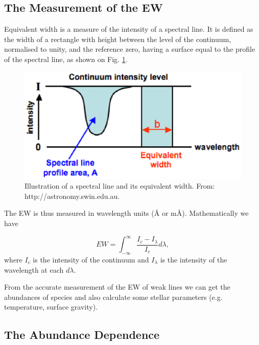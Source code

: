 \documentclass[dvips,12pt,a4paper]{report}
\begin{document}
{\subsection{The Measurement of the EW}

Equivalent width is a measure of the intensity of a spectral line. It is defined as the width of a rectangle with height between the level of the continuum, normalised to unity, and the reference zero, having a surface equal to the profile of the spectral line, as shown on Fig. \ref{ew}. 

\begin{figure}[h]
\centering
\includegraphics[height=5 cm]{pics/equivalent_width}
\caption{Illustration of a spectral line and its equivalent width. From: http://astronomy.swin.edu.au.}
\label{ew}
\end{figure}

The EW is thus measured in wavelength units (\AA{}  or m\AA). Mathematically we have

\begin{equation}
 EW=\int_{-\infty}^{\infty} \frac{I_c-I_\lambda}{I_c}d\lambda,
\end{equation}
where $I_c$ is the intensity of the continuum and $I_\lambda$ is the intensity of the wavelength at each $d\lambda$.

From the accurate measurement of the EW of weak lines we can get the abundances of species and also calculate some stellar parameters (e.g. temperature, surface gravity).

\subsection{The Abundance Dependence}
\label{abdep}

}
\end{document}
